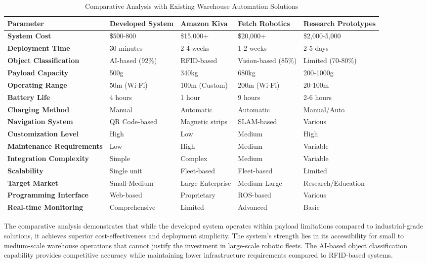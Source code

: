 \begin{table}[h!]
\centering
\caption{Comparative Analysis with Existing Warehouse Automation Solutions}
\label{tab:comparative_analysis}
\renewcommand{\arraystretch}{1.4}
\begin{tabular}{|p{3cm}|p{2.5cm}|p{2.5cm}|p{2.5cm}|p{2.5cm}|}
\hline
\textbf{Parameter} & \textbf{Developed System} & \textbf{Amazon Kiva} & \textbf{Fetch Robotics} & \textbf{Research Prototypes} \\
\hline
\hline
\textbf{System Cost} & \$500-800 & \$15,000+ & \$20,000+ & \$2,000-5,000 \\
\hline
\textbf{Deployment Time} & 30 minutes & 2-4 weeks & 1-2 weeks & 2-5 days \\
\hline
\textbf{Object Classification} & AI-based (92\%) & RFID-based & Vision-based (85\%) & Limited (70-80\%) \\
\hline
\textbf{Payload Capacity} & 500g & 340kg & 680kg & 200-1000g \\
\hline
\textbf{Operating Range} & 50m (Wi-Fi) & 100m (Custom) & 200m (Wi-Fi) & 20-100m \\
\hline
\textbf{Battery Life} & 4 hours & 1 hour & 9 hours & 2-6 hours \\
\hline
\textbf{Charging Method} & Manual & Automatic & Automatic & Manual/Auto \\
\hline
\textbf{Navigation System} & QR Code-based & Magnetic strips & SLAM-based & Various \\
\hline
\textbf{Customization Level} & High & Low & Medium & High \\
\hline
\textbf{Maintenance Requirements} & Low & High & Medium & Variable \\
\hline
\textbf{Integration Complexity} & Simple & Complex & Medium & Variable \\
\hline
\textbf{Scalability} & Single unit & Fleet-based & Fleet-based & Limited \\
\hline
\textbf{Target Market} & Small-Medium & Large Enterprise & Medium-Large & Research/Education \\
\hline
\textbf{Programming Interface} & Web-based & Proprietary & ROS-based & Various \\
\hline
\textbf{Real-time Monitoring} & Comprehensive & Limited & Advanced & Basic \\
\hline
\end{tabular}
\end{table}

The comparative analysis demonstrates that while the developed system operates within payload limitations compared to industrial-grade solutions, it achieves superior cost-effectiveness and deployment simplicity. The system's strength lies in its accessibility for small to medium-scale warehouse operations that cannot justify the investment in large-scale robotic fleets. The AI-based object classification capability provides competitive accuracy while maintaining lower infrastructure requirements compared to RFID-based systems.

